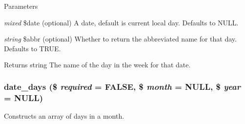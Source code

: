 \begin{DoxyParams}{Parameters}
\item[{\em mixed}]\$date (optional) A date, default is current local day. Defaults to NULL. \item[{\em string}]\$abbr (optional) Whether to return the abbreviated name for that day. Defaults to TRUE.\end{DoxyParams}
\begin{DoxyReturn}{Returns}
string The name of the day in the week for that date. 
\end{DoxyReturn}
\hypertarget{date__api_8module_a9dba2c8bbb9dba52e15626a75f53c4b3}{
\subsubsection[{date\_\-days}]{\setlength{\rightskip}{0pt plus 5cm}date\_\-days (\$ {\em required} = {\ttfamily FALSE}, \/  \$ {\em month} = {\ttfamily NULL}, \/  \$ {\em year} = {\ttfamily NULL})}}
\label{date__api_8module_a9dba2c8bbb9dba52e15626a75f53c4b3}
Constructs an array of days in a month.


